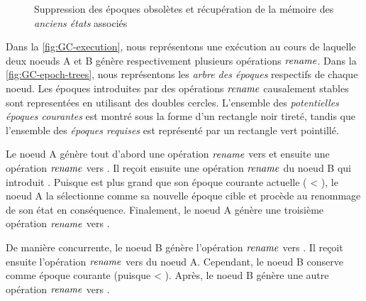 \begin{figure}[!ht]
{\begin{minipage}{\linewidth}
          \label{fig:GC-epoch-trees}
      \end{minipage}}
  \caption{Suppression des époques obsolètes et récupération de la mémoire des \emph{anciens états} associés}
  \label{fig:GC-epochs}
\end{figure}

Dans la \autoref{fig:GC-execution}, nous représentons une exécution au cours de laquelle deux noeuds A et B génère respectivement plusieurs opérations $\mathit{rename}$.
Dans la \autoref{fig:GC-epoch-trees}, nous représentons les \emph{arbre des époques} respectifs de chaque noeud.
Les époques introduites par des opérations $\mathit{rename}$ causalement stables sont representées en utilisant des doubles cercles.
L'ensemble des \emph{potentielles époques courantes} est montré sous la forme d'un rectangle noir tireté, tandis que l'ensemble des \emph{époques requises} est représenté par un rectangle vert pointillé.

Le noeud A génère tout d'abord une opération $\mathit{rename}$ vers  et ensuite une opération $\mathit{rename}$ vers .
Il reçoit ensuite une opération $\mathit{rename}$ du noeud B qui introduit .
Puisque  est plus grand que son époque courante actuelle ( < ), le noeud A la sélectionne comme sa nouvelle époque cible et procède au renommage de son état en conséquence.
Finalement, le noeud A génère une troisième opération $\mathit{rename}$ vers .

De manière concurrente, le noeud B génère l'opération $\mathit{rename}$ vers .
Il reçoit ensuite l'opération $\mathit{rename}$ vers  du noeud A.
Cependant, le noeud B conserve  comme époque courante (puisque  < ).
Après, le noeud B génère une autre opération $\mathit{rename}$ vers .

